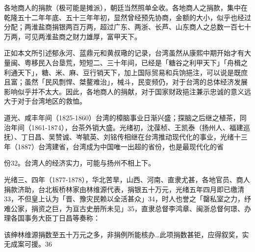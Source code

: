 各地商人的捐款（极可能是摊派），朝廷当然照单全收。各地商人之捐款，集中在乾隆五十二年年底、五十三年年初，显然曾经预先协商，金额的大小，似乎也经过分配；两淮盐商捐银两百万两，超过广东、两浙、长芦、山东商人之总数一百七十万两，可见两淮盐商之财力雄厚，富甲天下。

正如本文所引述郁永河、蓝鼎元和黄叔璥的记录，台湾虽然从康熙中期开始才有大量闽、粤移民入台垦荒，短短二、三十年间，已经是「糖谷之利甲天下」「舟楫之利通天下」，糖、米、麻、豆行销天下，加上国际贸易和兵饷挹注，可以说是既庶且富；虽然「民风剽悍、桀鳌难治」，械斗，民变频仍，对于台湾的总体经济发展影响似乎并不太大。因此，各地商人的捐献，对于国家财政挹注兼示忠诚的意义远大于对于台湾地区的救恤。

道光、咸丰年间（1825-1860）台湾的樟脑事业日渐兴盛；探脑之后继之植茶，同治年间（1861-1874），台茶外销大盛。光绪初，沈葆桢、王凯泰（扬州人、福建巡抚）、丁日昌、吴赞诚、岑毓英、刘铭传相继在台湾推动现代化的事业，光绪十三年（1887）台湾建省，台湾成为中国唯一出超的省份，也是最现代化的省

\vfill
\begin{BookNotes}
\end{BookNotes}

\noindent 份32。台湾人的经济实力，可能与扬州不相上下。

光绪三、四年（1877-1878），华北苦旱，山西、河南、直隶尤甚，各地官员、商人捐款济助，台北板桥林家由林维源代表，捐银五十万元，光绪五年四月即已缴清33，不但皇上认为「晋、豫灾民赖以全活甚众」34，时人也誉之「罄私室之力，纾难公家，捐资之巨，为亘古史册所未见」35，直隶总督李鸿章、闽浙总督何璟、办理各国事务大臣丁日昌等奏称：

\begin{BookQuote}
该绅林维源捐数至五十万元之多，非捐例所能核办…此项捐数甚钜，应得叙奖，实无成案可援。36
\end{BookQuote}

